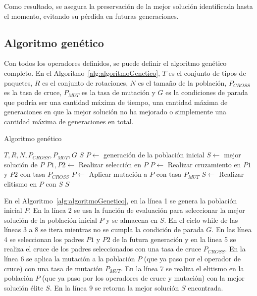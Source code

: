\documentclass[openany]{article}
\begin{document}
Como resultado, se asegura la preservación de la mejor solución identificada hasta el momento, evitando su pérdida en futuras generaciones.

\subsection{Algoritmo genético}

Con todos los operadores definidos, se puede definir el algoritmo genético completo. En el Algoritmo~\ref{alg:algoritmoGenetico}, $T$ es el conjunto de tipos de paquetes, $R$ es el conjunto de rotaciones, $N$ es el tamaño de la población, $P_{CROSS}$ es la tasa de cruce, $P_{MUT}$ es la tasa de mutación y $G$ es la condiciones de parada que podría ser una cantidad máxima de tiempo, una cantidad máxima de generaciones en que la mejor solución no ha mejorado o simplemente una cantidad máxima de generaciones en total.

\begin{algorithm}[H]
    \caption{Algoritmo genético}\label{alg:algoritmoGenetico}
    \begin{algorithmic}[1]
        \Require $T, R, N, P_{CROSS}, P_{MUT}, G$
        \Ensure $S$
        \State $P \leftarrow$ generación de la población inicial
        \State $S \leftarrow$ mejor solución de $P$
        \State $P1,P2 \leftarrow$ Realizar selección en $P$
        \State $P \leftarrow$ Realizar cruzamiento en $P1$ y $P2$ con tasa $P_{CROSS}$
        \State $P \leftarrow$ Aplicar mutación a $P$ con tasa $P_{MUT}$
        \State $S \leftarrow$ Realizar elitismo en $P$ con $S$
        \EndWhile
        \State \Return $S$
    \end{algorithmic}
\end{algorithm}

En el Algoritmo~\ref{alg:algoritmoGenetico}, en la línea 1 se genera la población inicial $P$. En la línea 2 se usa la función de evaluación para seleccionar la mejor solución de la población inicial $P$ y se almacena en $S$. En el ciclo while de las líneas 3 a 8 se itera mientras no se cumpla la condición de parada $G$. En las línea 4 se seleccionan los padres $P1$ y $P2$ de la futura generación y en la linea 5 se realiza el cruce de los padres seleccionados con una tasa de cruce $P_{CROSS}$. En la línea 6 se aplica la mutación a la población $P$ (que ya paso por el operador de cruce) con una tasa de mutación $P_{MUT}$. En la línea 7 se realiza el elitismo en la población $P$ (que ya paso por los operadores de cruce y mutación) con la mejor solución élite $S$. En la línea 9 se retorna la mejor solución $S$ encontrada.
\end{document}

